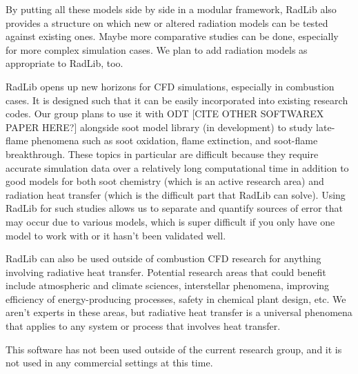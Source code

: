 \documentclass[preprint,12pt, a4paper]{elsarticle}
\begin{document}
By putting all these models side by side in a modular framework, RadLib also provides a structure on which new or altered radiation models can be tested against existing ones. Maybe more comparative studies can be done, especially for more complex simulation cases. We plan to add radiation models as appropriate to RadLib, too. 

RadLib opens up new horizons for CFD simulations, especially in combustion cases. It is designed such that it can be easily incorporated into existing research codes. Our group plans to use it with ODT [CITE OTHER SOFTWAREX PAPER HERE?] alongside soot model library (in development) to study late-flame phenomena such as soot oxidation, flame extinction, and soot-flame breakthrough. These topics in particular are difficult because they require accurate simulation data over a relatively long computational time in addition to good models for both soot chemistry (which is an active research area) and radiation heat transfer (which is the difficult part that RadLib can solve). Using RadLib for such studies allows us to separate and quantify sources of error that may occur due to various models, which is super difficult if you only have one model to work with or it hasn't been validated well. 

RadLib can also be used outside of combustion CFD research for anything involving radiative heat transfer. Potential research areas that could benefit include atmospheric and climate sciences, interstellar phenomena, improving efficiency of energy-producing processes, safety in chemical plant design, etc. We aren't experts in these areas, but radiative heat transfer is a universal phenomena that applies to any system or process that involves heat transfer. 

This software has not been used outside of the current research group, and it is not used in any commercial settings at this time. 

\end{document}

